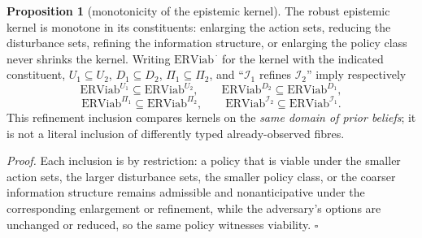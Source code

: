 \documentclass[11pt]{article}
\theoremstyle{definition}
\newtheorem{proposition}{Proposition}
\begin{document}
\begin{proposition}[monotonicity of the epistemic kernel]\label{prop:monotone}
The robust epistemic kernel is monotone in its constituents: enlarging
the action sets, reducing the disturbance sets, refining the information
structure, or enlarging the policy class never shrinks the kernel.
Writing \(\mathrm{ERViab}^{\,\cdot}\) for the kernel with the indicated
constituent, \(U_1\subseteq U_2\), \(D_1\subseteq D_2\),
\(\Pi_1\subseteq\Pi_2\), and ``\(\mathcal{I}_1\) refines
\(\mathcal{I}_2\)'' imply respectively
\[\mathrm{ERViab}^{U_1} \subseteq \mathrm{ERViab}^{U_2}, \qquad
\mathrm{ERViab}^{D_2} \subseteq \mathrm{ERViab}^{D_1},\]
\[\mathrm{ERViab}^{\Pi_1} \subseteq \mathrm{ERViab}^{\Pi_2}, \qquad
\mathrm{ERViab}^{\mathcal{I}_2} \subseteq \mathrm{ERViab}^{\mathcal{I}_1}.\]
This refinement inclusion compares kernels on the \emph{same domain of prior beliefs}; it is not a literal inclusion of differently typed already-observed fibres.
\end{proposition}

\emph{Proof.} Each inclusion is by restriction: a policy that is viable
under the smaller action sets, the larger disturbance sets, the smaller
policy class, or the coarser information structure remains admissible
and nonanticipative under the corresponding enlargement or refinement,
while the adversary's options are unchanged or reduced, so the same
policy witnesses viability. \ensuremath{\square}
\end{document}

